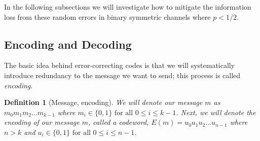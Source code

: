 \documentclass[12pt]{article}
\newtheorem{definition}{Definition}
\begin{document}
In the following subsections we will investigate how to mitigate the information loss from these random errors in binary symmetric channels where $p<1/2$.

\subsection{Encoding and Decoding}
The basic idea behind error-correcting codes is that we will systematically introduce redundancy to the message we want to send; this process is called \textit{encoding}.

\begin{definition}[Message, encoding] We will denote our message $m$ as $m_0m_1m_2 \ldots m_{k-1}$ where $m_i \in \{0,1\} \text{ for all }0 \leq i \leq k-1$. Next, we will denote the encoding of our message $m$, called a codeword, $E(m) = u_0u_1u_2 \ldots u_{n-1}$ where $n > k$ and $u_i \in \{0,1\} \text{ for all }0 \leq i \leq n-1$. 
\end{definition}
\end{document}
